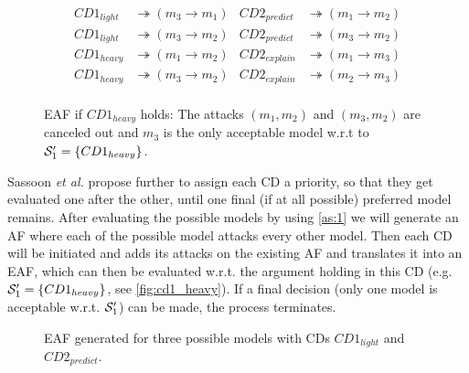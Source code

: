 \begin{align*}
CD1_{light} &\twoheadrightarrow (m_3 \rightarrow m_1) & CD2_{predict} &\twoheadrightarrow (m_1 \rightarrow m_2)\\
CD1_{light} &\twoheadrightarrow (m_3 \rightarrow m_2) & CD2_{predict} &\twoheadrightarrow (m_3 \rightarrow m_2)\\
CD1_{heavy} &\twoheadrightarrow (m_1 \rightarrow m_2) & CD2_{explain} &\twoheadrightarrow (m_1 \rightarrow m_3)\\
CD1_{heavy} &\twoheadrightarrow (m_3 \rightarrow m_2) & CD2_{explain} &\twoheadrightarrow (m_2 \rightarrow m_3)\\
\end{align*}

\begin{figure}[!hb]
	\centering
	
	\caption{\gls{EAF} if $CD1_{heavy}$ holds: The attacks $(m_1,m_2)$ and $(m_3,m_2)$ are canceled out and $m_3$ is the only acceptable model w.r.t to $\S_1' = \{CD1_{heavy}\}$.}
	\label{fig:cd1_heavy}
\end{figure}

Sassoon \textit{et al.} propose further to assign each \gls{CD} a priority, so that they get evaluated one after the other, until one final (if at all possible) preferred model remains. After evaluating the possible models by using \autoref{as:1} we will generate an \gls{AF} where each of the possible model attacks every other model. Then each \gls{CD} will be initiated and adds its attacks on the existing \gls{AF} and translates it into an \gls{EAF}, which can then be evaluated w.r.t. the argument holding in this \gls{CD} (e.g. $\S_1' = \{CD1_{heavy}\}$, see \autoref{fig:cd1_heavy}). If a final decision (only one model is acceptable w.r.t. $\S_1'$) can be made, the process terminates. 


\begin{figure}[!h]
	\hfill
	\caption{\gls{EAF} generated for three possible models with \glspl{CD} $CD1_{light}$ and $CD2_{predict}$.}
	\label{fig:cd1_light_cd2_predict}
\end{figure}



